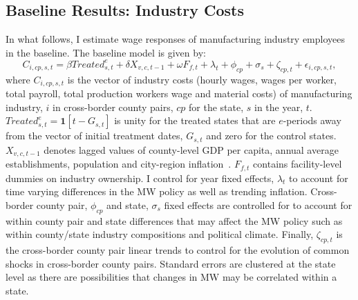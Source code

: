 \documentclass[12pt, english]{article}
\begin{document}
    \subsection{Baseline Results: Industry Costs}\label{subsec:baseline-results-industry-costs}
    In what follows, I estimate wage responses of manufacturing industry employees in the baseline. The baseline model is given by:
    \begin{equation}
        C_{i,cp,s,t} = \beta Treated_{s,t}^e + \delta X_{v,c,t-1} + \omega F_{f,t} + \lambda_{t} + \phi_{cp} + \sigma_{s} + \zeta_{cp,t} + \epsilon_{i,cp,s,t},\label{eq:baseline-wages}
    \end{equation}
    where $C_{i,cp,s,t}$ is the vector of industry costs (hourly wages, wages per worker, total payroll, total production workers wage and material costs) of manufacturing industry, $i$ in cross-border county pairs, $cp$ for the state, $s$ in the year, $t$. $Treated_{s,t}^e = \textbf{1}[t - G_{s,t}]$ is unity for the treated states that are $e$-periods away from the vector of initial treatment dates, $G_{s,t}$ and zero for the control states. $X_{v,c,t-1}$ denotes lagged values of county-level GDP per capita, annual average establishments, population and city-region inflation~\parencite{gopalan2021state, dube2010minimum, clemens2019making}. $F_{f,t}$ contains facility-level dummies on industry ownership. I control for year fixed effects, $\lambda_{t}$ to account for time varying differences in the MW policy as well as trending inflation. Cross-border county pair, $\phi_{cp}$ and state, $\sigma_{s}$ fixed effects are controlled for to account for within county pair and state differences that may affect the MW policy such as within county/state industry compositions and political climate. Finally, $\zeta_{cp,t}$ is the cross-border county pair linear trends to control for the evolution of common shocks in cross-border county pairs. Standard errors are clustered at the state level as there are possibilities that changes in MW may be correlated within a state.
    
\end{document}
